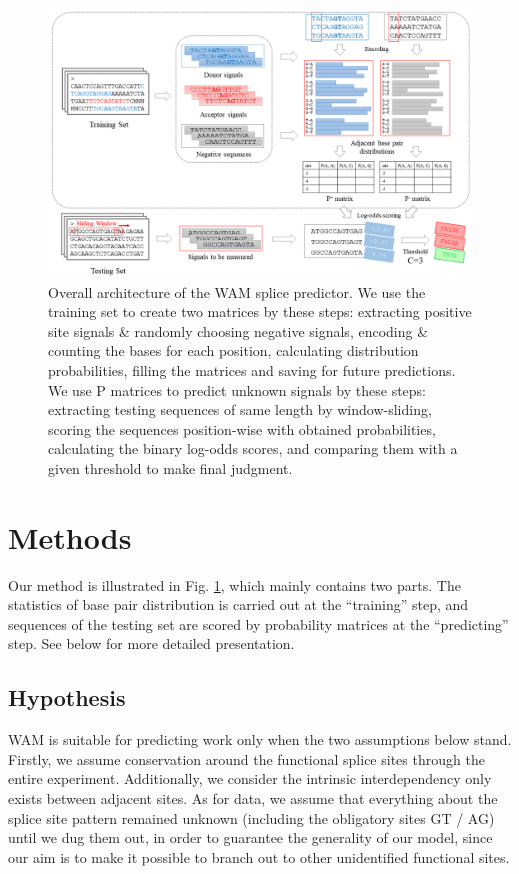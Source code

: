 \documentclass[journal,twoside]{IEEEtran}
\begin{document}
\begin{figure}[htbp]
\centerline{\includegraphics[scale=0.5]{Pics/WAM.png}}
\caption{Overall architecture of the WAM splice predictor. We use the training set to create two matrices by these steps: extracting positive site signals \& randomly choosing negative signals, encoding \& counting the bases for each position, calculating distribution probabilities, filling the matrices and saving for future predictions. We use P matrices to predict unknown signals by these steps: extracting testing sequences of same length by window-sliding, scoring the sequences position-wise with obtained probabilities, calculating the binary log-odds scores, and comparing them with a given threshold to make final judgment. }
\label{fig2}
\end{figure}

\section{Methods}\label{2}

Our method is illustrated in Fig. \ref{fig2}, which mainly contains two parts. The statistics of base pair distribution is carried out at the ``training'' step, and sequences of the testing set are scored by probability matrices at the ``predicting'' step. See below for more detailed presentation. 

\subsection{Hypothesis}\label{2.1}

WAM is suitable for predicting work only when the two assumptions below stand. Firstly, we assume conservation around the functional splice sites through the entire experiment. Additionally, we consider the intrinsic interdependency only exists between adjacent sites. As for data, we assume that everything about the splice site pattern remained unknown (including the obligatory sites GT / AG) until we dug them out, in order to guarantee the generality of our model, since our aim is to make it possible to branch out to other unidentified functional sites. 
\end{document}
